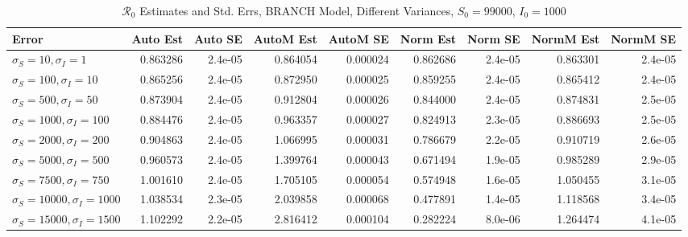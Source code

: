 \documentclass[12pt]{article}
\newcommand{\rr}{\ensuremath{\mathcal{R}_0}}
\begin{document}
\begin{table}[H]
	
	\caption{$\rr$ Estimates and Std. Errs, BRANCH Model, 
		Different Variances, $S_0 = 99000$, $I_0 = 1000$}
	\begin{footnotesize}
		\hskip -1.7cm
	\begin{tabular}{l|r|r|r|r|r|r|r|r}
		\hline
		Error & Auto Est & Auto SE & AutoM Est & AutoM SE & Norm Est & Norm SE & NormM Est & NormM SE\\
		\hline
		$\sigma_S = 10, \sigma_I = 1$ & 0.863286 & 2.4e-05 & 0.864054 & 0.000024 & 0.862686 & 2.4e-05 & 0.863301 & 2.4e-05\\
		\hline
		$\sigma_S = 100, \sigma_I = 10$ & 0.865256 & 2.4e-05 & 0.872950 & 0.000025 & 0.859255 & 2.4e-05 & 0.865412 & 2.4e-05\\
		\hline
		$\sigma_S = 500, \sigma_I = 50$ & 0.873904 & 2.4e-05 & 0.912804 & 0.000026 & 0.844000 & 2.4e-05 & 0.874831 & 2.5e-05\\
		\hline
		$\sigma_S = 1000, \sigma_I = 100$ & 0.884476 & 2.4e-05 & 0.963357 & 0.000027 & 0.824913 & 2.3e-05 & 0.886693 & 2.5e-05\\
		\hline
		$\sigma_S = 2000, \sigma_I = 200$ & 0.904863 & 2.4e-05 & 1.066995 & 0.000031 & 0.786679 & 2.2e-05 & 0.910719 & 2.6e-05\\
		\hline
		$\sigma_S = 5000, \sigma_I = 500$ & 0.960573 & 2.4e-05 & 1.399764 & 0.000043 & 0.671494 & 1.9e-05 & 0.985289 & 2.9e-05\\
		\hline
		$\sigma_S = 7500, \sigma_I = 750$ & 1.001610 & 2.4e-05 & 1.705105 & 0.000054 & 0.574948 & 1.6e-05 & 1.050455 & 3.1e-05\\
		\hline
		$\sigma_S = 10000, \sigma_I = 1000$ & 1.038534 & 2.3e-05 & 2.039858 & 0.000068 & 0.477891 & 1.4e-05 & 1.118568 & 3.4e-05\\
		\hline
		$\sigma_S = 15000, \sigma_I = 1500$ & 1.102292 & 2.2e-05 & 2.816412 & 0.000104 & 0.282224 & 8.0e-06 & 1.264474 & 4.1e-05\\
		\hline
	\end{tabular}
\end{footnotesize}
\end{table}
\end{document}
